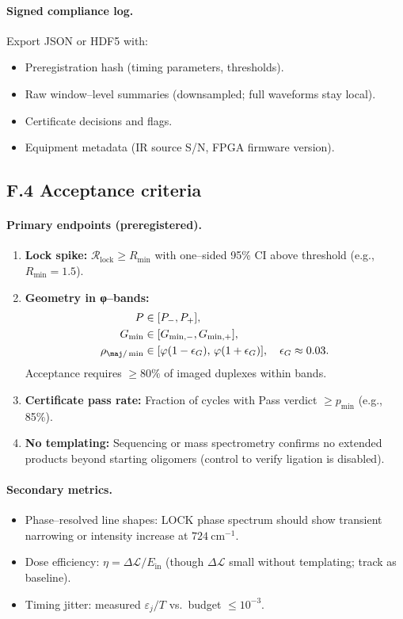 \documentclass[11pt]{article}
\begin{document}
\paragraph{Signed compliance log.}
Export JSON or HDF5 with:
\begin{itemize}
\item Preregistration hash (timing parameters, thresholds).
\item Raw window–level summaries (downsampled; full waveforms stay local).
\item Certificate decisions and flags.
\item Equipment metadata (IR source S/N, FPGA firmware version).
\end{itemize}

\subsection*{F.4 Acceptance criteria}

\paragraph{Primary endpoints (preregistered).}
\begin{enumerate}
\item \textbf{Lock spike:} $\mathcal{R}_{\mathrm{lock}}\ge R_{\min}$ with one–sided 95\% CI above threshold (e.g., $R_{\min}=1.5$).
\item \textbf{Geometry in φ–bands:}
\begin{align*}
P&\in[P_-,P_+],\\
G_{\min}&\in[G_{\min,-},G_{\min,+}],\\
\rho_{\maj/\min}&\in[\varphi(1-\epsilon_G),\,\varphi(1+\epsilon_G)],\quad \epsilon_G\approx 0.03.
\end{align*}
Acceptance requires $\ge 80\%$ of imaged duplexes within bands.
\item \textbf{Certificate pass rate:} Fraction of cycles with \textsf{Pass} verdict $\ge p_{\min}$ (e.g., 85\%).
\item \textbf{No templating:} Sequencing or mass spectrometry confirms no extended products beyond starting oligomers (control to verify ligation is disabled).
\end{enumerate}

\paragraph{Secondary metrics.}
\begin{itemize}
\item Phase–resolved line shapes: LOCK phase spectrum should show transient narrowing or intensity increase at $724~\mathrm{cm^{-1}}$.
\item Dose efficiency: $\eta=\Delta\mathcal{L}/E_{\mathrm{in}}$ (though $\Delta\mathcal{L}$ small without templating; track as baseline).
\item Timing jitter: measured $\varepsilon_j/T$ vs.\ budget $\le 10^{-3}$.
\end{itemize}
\end{document}

